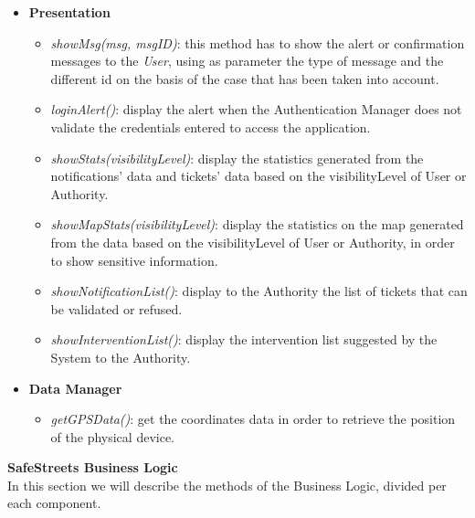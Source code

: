 \documentclass{article}
\begin{document}
	\begin{itemize}
		\item {\bf Presentation}
		\begin{itemize}
		\item {\it showMsg(msg, msgID)}: this method has to show the alert or confirmation messages to the {\it User}, using as parameter the type of message and the different id on the basis of the case that has been taken into account. 
		\item {\it loginAlert()}: display the alert when the Authentication Manager does not validate the credentials entered to access the application.
		\item {\it showStats(visibilityLevel)}: display the statistics generated from the notifications' data and tickets' data based on the visibilityLevel of User or Authority.
		\item {\it showMapStats(visibilityLevel)}: display the statistics on the map generated from the data based on the visibilityLevel of User or Authority, in order to show sensitive information.
		\item {\it showNotificationList()}: display to the Authority the list of tickets that can be validated or refused.
		\item {\it showInterventionList()}: display the intervention list suggested by the System to the Authority.
		\end{itemize} 
		\item {\bf Data Manager}
		\begin{itemize}
		\item {\it getGPSData()}: get the coordinates data in order to retrieve the position of the physical device.
		\end{itemize}
	\end{itemize} 
	{\bf SafeStreets Business Logic} \\
	In this section we will describe the methods of the Business Logic, divided per each component.
\end{document}
